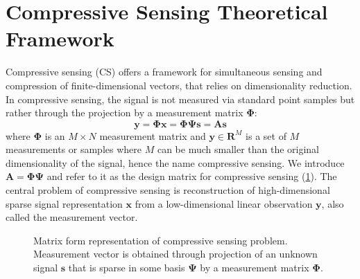 \documentclass[journal]{IEEEtran}
\begin{document}
\section{Compressive Sensing Theoretical Framework} \label{sec:2}
Compressive sensing (CS) offers a framework for simultaneous sensing and compression of finite-dimensional vectors, that relies on dimensionality reduction. In compressive sensing, the signal is not measured via standard point samples but rather through the projection by a measurement matrix $\boldsymbol{\Phi}$:
%
\begin{equation}
	\boldsymbol{y}=\boldsymbol{\Phi} \boldsymbol{x}=\boldsymbol{\Phi} \boldsymbol{\Psi} \boldsymbol{s}=\boldsymbol{A} \boldsymbol{s}
\end{equation}
%
where $\boldsymbol{\Phi}$ is an $M\times N$ measurement matrix and $\boldsymbol{y}\in\mathbf{R}^M$ is a set of $M$ measurements or samples where $M$ can be much smaller than the original dimensionality of the signal, hence the name compressive sensing. We introduce $\boldsymbol{A}=\boldsymbol{\Phi}\boldsymbol{\Psi}$ and refer to it as the design matrix for compressive sensing (\ref{fig:cs_matrices}). The central problem of compressive sensing is reconstruction of high-dimensional sparse signal representation $\boldsymbol{x}$ from a low-dimensional linear observation $\boldsymbol{y}$, also called the measurement vector. 
%
\begin{figure}
	

	\caption{Matrix form representation of compressive sensing problem. Measurement vector is obtained through projection of an unknown signal $\boldsymbol{s}$ that is sparse in some basis $\boldsymbol{\Psi}$ by a measurement matrix $\boldsymbol{\Phi}$. \cite{cs_matrices_url}}
	
	\label{fig:cs_matrices}
\end{figure}
\end{document}
